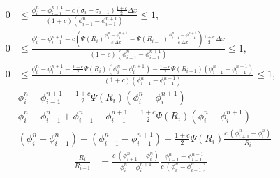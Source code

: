 \documentclass[../thesis.tex]{subfiles}
\begin{document}
\begin{equation}
    \begin{split}
        0
        &\leq
        \frac{\phi_{i}^{n} - \phi_{i-1}^{n+1}
        -c\left(
            \sigma_{i} - \sigma_{i-1}
            \right)\frac{1+c}{2}\Delta x}
            {(1+c)\left( \phi_{i-1}^{n} - \phi_{i-1}^{n+1} \right)}
        \leq
        1,
        \\
        0
        &\leq
        \frac{\phi_{i}^{n} - \phi_{i-1}^{n+1}
        -c\left(
            \Psi(R_{i})\frac{\phi_{i}^{n} - \phi_{i}^{n+1}}{c~\Delta x}
            - \Psi(R_{i-1})\frac{\phi_{i-1}^{n} - \phi_{i-1}^{n+1}}{c~\Delta x}
            \right)\frac{1+c}{2}\Delta x}
            {(1+c)\left( \phi_{i-1}^{n} - \phi_{i-1}^{n+1} \right)}
        \leq
        1,
        \\
        0
        &\leq
        \frac{\phi_{i}^{n} - \phi_{i-1}^{n+1}
            -\frac{1+c}{2}
            \Psi(R_{i})\left( \phi_{i}^{n} - \phi_{i}^{n+1} \right)
            - \frac{1+c}{2}
            \Psi(R_{i-1})\left( \phi_{i-1}^{n} - \phi_{i-1}^{n+1} \right)}
            {(1+c)\left( \phi_{i-1}^{n} - \phi_{i-1}^{n+1} \right)}
        \leq
        1,
    \end{split}
\end{equation}
\begin{equation}
    \begin{split}
        &\phi_{i}^{n} - \phi_{i-1}^{n+1}
        -\frac{1+c}{2}
        \Psi(R_{i})\left( \phi_{i}^{n} - \phi_{i}^{n+1} \right)
        \\
        &\phi_{i}^{n} -\phi_{i-1}^{n}
        +\phi_{i-1}^{n} - \phi_{i-1}^{n+1}
        -\frac{1+c}{2}
        \Psi(R_{i})\left( \phi_{i}^{n} - \phi_{i}^{n+1} \right)
        \\
        &(\phi_{i}^{n} -\phi_{i-1}^{n})
        +(\phi_{i-1}^{n} - \phi_{i-1}^{n+1})
        -\frac{1+c}{2}
        \Psi(R_{i})
        \frac{c~\left( \phi_{i+1}^{n}-\phi_{i}^{n} \right)}
    {R_{i}}
    \end{split}
\end{equation}
\begin{equation}
    \begin{split}
        \frac{R_{i}}{R_{i-1}}
        &=
        \frac{c~\left( \phi_{i+1}^{n}-\phi_{i}^{n} \right)}
        {\phi_{i}^{n} - \phi_{i}^{n+1}}
        \frac{\phi_{i-1}^{n} - \phi_{i-1}^{n+1}}
        {c~\left( \phi_{i}^{n}-\phi_{i-1}^{n} \right)}
    \end{split}
\end{equation}
\end{document}
